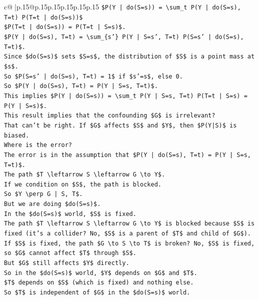 \documentclass{article}
\begin{document}
{\begin{supertabular}{c@{$\;$}|p{.15\linewidth}@{}p{.15\linewidth}p{.15\linewidth}p{.15\linewidth}p{.15\linewidth}p{.15\linewidth}}
{{{\texttt{\$P(Y | do(S=s)) = \textbackslash{}sum\_t P(Y | do(S=s), T=t) P(T=t | do(S=s))\$} \\
\texttt{\$P(T=t | do(S=s)) = P(T=t | S=s)\$.} \\
\texttt{\$P(Y | do(S=s), T=t) = \textbackslash{}sum\_\{s'\} P(Y | S=s', T=t) P(S=s' | do(S=s), T=t)\$.} \\
\texttt{Since \$do(S=s)\$ sets \$S=s\$, the distribution of \$S\$ is a point mass at \$s\$.} \\
\texttt{So \$P(S=s' | do(S=s), T=t) = 1\$ if \$s'=s\$, else 0.} \\
\texttt{So \$P(Y | do(S=s), T=t) = P(Y | S=s, T=t)\$.} \\
\texttt{This implies \$P(Y | do(S=s)) = \textbackslash{}sum\_t P(Y | S=s, T=t) P(T=t | S=s) = P(Y | S=s)\$.} \\
\texttt{This result implies that the confounding \$G\$ is irrelevant?} \\
\texttt{That can't be right. If \$G\$ affects \$S\$ and \$Y\$, then \$P(Y|S)\$ is biased.} \\
\texttt{Where is the error?} \\
\texttt{The error is in the assumption that \$P(Y | do(S=s), T=t) = P(Y | S=s, T=t)\$.} \\
\texttt{The path \$T \textbackslash{}leftarrow S \textbackslash{}leftarrow G \textbackslash{}to Y\$.} \\
\texttt{If we condition on \$S\$, the path is blocked.} \\
\texttt{So \$Y \textbackslash{}perp G | S, T\$.} \\
\texttt{But we are doing \$do(S=s)\$.} \\
\texttt{In the \$do(S=s)\$ world, \$S\$ is fixed.} \\
\texttt{The path \$T \textbackslash{}leftarrow S \textbackslash{}leftarrow G \textbackslash{}to Y\$ is blocked because \$S\$ is fixed (it's a collider? No, \$S\$ is a parent of \$T\$ and child of \$G\$).} \\
\texttt{If \$S\$ is fixed, the path \$G \textbackslash{}to S \textbackslash{}to T\$ is broken? No, \$S\$ is fixed, so \$G\$ cannot affect \$T\$ through \$S\$.} \\
\texttt{But \$G\$ still affects \$Y\$ directly.} \\
\texttt{So in the \$do(S=s)\$ world, \$Y\$ depends on \$G\$ and \$T\$.} \\
\texttt{\$T\$ depends on \$S\$ (which is fixed) and nothing else.} \\
\texttt{So \$T\$ is independent of \$G\$ in the \$do(S=s)\$ world.} \\
}}}
\end{supertabular}}
\end{document}

